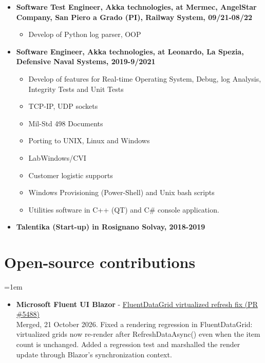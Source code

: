 \documentclass{article}
\begin{document}
\begin{itemize}
\begin{itemize}
    \item C\# Server with OPC-UA Protocol.
    \item Asp .net core API
\end{itemize}
\item \textbf{Software Test Engineer, Akka technologies, at Mermec, AngelStar Company, San Piero a Grado (PI), Railway System, 09/21-08/22}
\begin{itemize}
    \item Develop of Python log parser, OOP
\end{itemize}
\item \textbf{Software Engineer, Akka technologies, at Leonardo, La Spezia, Defensive Naval Systems, 2019-9/2021}
\begin{itemize}
    \item Develop of features for Real-time Operating System, Debug, log Analysis, Integrity Tests and Unit Tests
    \item TCP-IP, UDP sockets
    \item Mil-Std 498 Documents
    \item Porting to UNIX, Linux and Windows
    \item LabWindows/CVI
    \item Customer logistic supports
    \item Windows Provisioning (Power-Shell) and Unix bash scripts
    \item Utilities software in C++ (QT) and C\# console application.
\end{itemize}
\item \textbf{Talentika (Start-up) in Rosignano Solvay, 2018-2019}
\end{itemize}

\section{Open-source contributions}
\begingroup\emergencystretch=1em
\begin{itemize}
\item \textbf{Microsoft Fluent UI Blazor} - \href{https://github.com/microsoft/fluentui-blazor/pull/5488}{FluentDataGrid virtualized refresh fix (PR \#5488)}\\
Merged, 21 October 2026. Fixed a rendering regression in FluentDataGrid: virtualized grids now re-render after RefreshDataAsync() even when the item count is unchanged. Added a regression test and marshalled the render update through Blazor's synchronization context.
\end{itemize}
\endgroup
\end{document}
